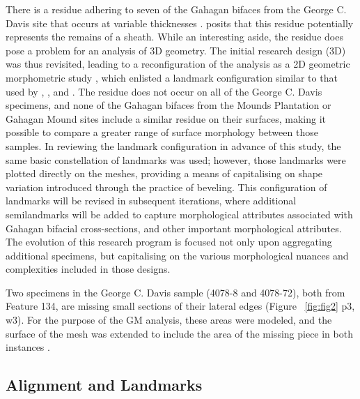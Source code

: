 \documentclass[review]{elsarticle}
\begin{document}
There is a residue adhering to seven of the Gahagan bifaces from the George C. Davis site that occurs at variable thicknesses \citep[Figure 2]{RN11783}. \citet[228]{RN3684} posits that this residue potentially represents the remains of a sheath. While an interesting aside, the residue does pose a problem for an analysis of 3D geometry. The initial research design (3D) was thus revisited, leading to a reconfiguration of the analysis as a 2D geometric morphometric study \citep{RN11783}, which enlisted a landmark configuration similar to that used by \citet[Figure 2]{RN1754}, \citet[Figure 2]{RN1736}, and \citet[Figure 1]{RN11731}. The residue does not occur on all of the George C. Davis specimens, and none of the Gahagan bifaces from the Mounds Plantation or Gahagan Mound sites include a similar residue on their surfaces, making it possible to compare a greater range of surface morphology between those samples. In reviewing the landmark configuration in advance of this study, the same basic constellation of landmarks was used; however, those landmarks were plotted directly on the meshes, providing a means of capitalising on shape variation introduced through the practice of beveling. This configuration of landmarks will be revised in subsequent iterations, where additional semilandmarks will be added to capture morphological attributes associated with Gahagan bifacial cross-sections, and other important morphological attributes. The evolution of this research program is focused not only upon aggregating additional specimens, but capitalising on the various morphological nuances and complexities included in those designs.

Two specimens in the George C. Davis sample (4078-8 and 4078-72), both from Feature 134, are missing small sections of their lateral edges (Figure ~\ref{fig:fig2} p3, w3). For the purpose of the GM analysis, these areas were modeled, and the surface of the mesh was extended to include the area of the missing piece in both instances \citep{RN20850}.

\subsection*{Alignment and Landmarks}
\end{document}

